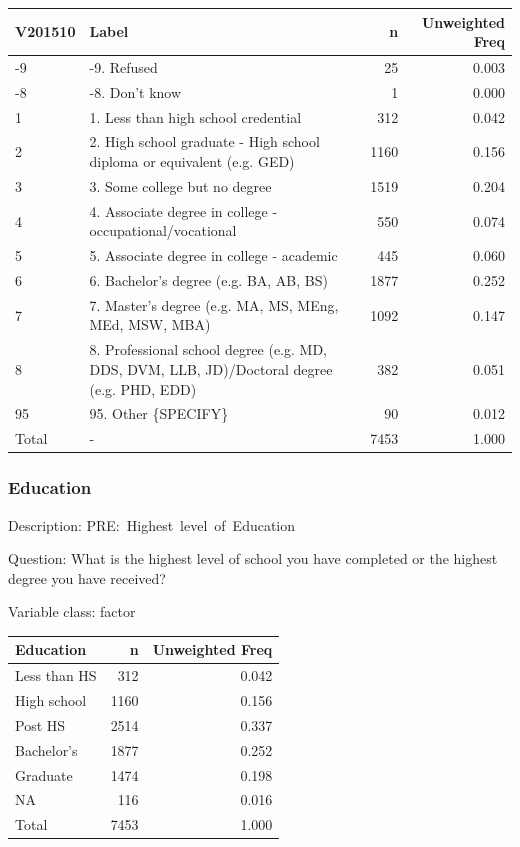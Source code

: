 \documentclass[
]{krantz}
\begin{document}
\begin{tabular}[t]{l|l|r|r}
\hline
V201510 & Label & n & Unweighted Freq\\
\hline
-9 & -9. Refused & 25 & 0.003\\
\hline
-8 & -8. Don't know & 1 & 0.000\\
\hline
1 & 1. Less than high school credential & 312 & 0.042\\
\hline
2 & 2.  High school graduate - High school diploma or equivalent (e.g. GED) & 1160 & 0.156\\
\hline
3 & 3. Some college but no degree & 1519 & 0.204\\
\hline
4 & 4. Associate degree in college - occupational/vocational & 550 & 0.074\\
\hline
5 & 5. Associate degree in college - academic & 445 & 0.060\\
\hline
6 & 6. Bachelor's degree (e.g. BA, AB, BS) & 1877 & 0.252\\
\hline
7 & 7. Master's degree (e.g. MA, MS, MEng, MEd, MSW, MBA) & 1092 & 0.147\\
\hline
8 & 8. Professional school degree (e.g. MD, DDS, DVM, LLB, JD)/Doctoral degree (e.g. PHD, EDD) & 382 & 0.051\\
\hline
95 & 95. Other \{SPECIFY\} & 90 & 0.012\\
\hline
Total & - & 7453 & 1.000\\
\hline
\end{tabular}

\hypertarget{education}{%
\subsubsection*{Education}\label{education}}


Description: PRE:~Highest~level~of~Education

Question: What is the highest level of school you have completed or the highest degree you have received?

Variable class: factor

\begin{tabular}[t]{l|r|r}
\hline
Education & n & Unweighted Freq\\
\hline
Less than HS & 312 & 0.042\\
\hline
High school & 1160 & 0.156\\
\hline
Post HS & 2514 & 0.337\\
\hline
Bachelor's & 1877 & 0.252\\
\hline
Graduate & 1474 & 0.198\\
\hline
NA & 116 & 0.016\\
\hline
Total & 7453 & 1.000\\
\hline
\end{tabular}
\end{document}
